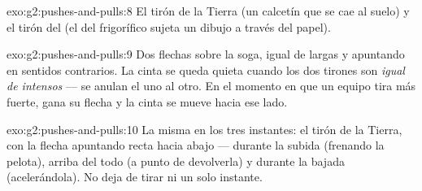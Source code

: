 \begin{solution}{exo:g2:pushes-and-pulls:8}
El tirón de la Tierra (un calcetín que se cae al suelo) y el tirón del
 (el  del frigorífico sujeta un dibujo a través del papel).
\end{solution}

\begin{solution}{exo:g2:pushes-and-pulls:9}
Dos flechas sobre la soga, igual de largas y apuntando en sentidos
contrarios. La cinta se queda quieta cuando los dos tirones son
\emph{igual de intensos} --- se anulan el uno al otro. En el momento
en que un equipo tira más fuerte, gana su flecha y la cinta se mueve
hacia ese lado.
\end{solution}

\begin{solution}{exo:g2:pushes-and-pulls:10}
La misma  en los tres instantes: el tirón de la Tierra, con la
flecha apuntando recta hacia abajo --- durante la subida (frenando la
pelota), arriba del todo (a punto de devolverla) y durante la bajada
(acelerándola). No deja de tirar ni un solo instante.
\end{solution}
